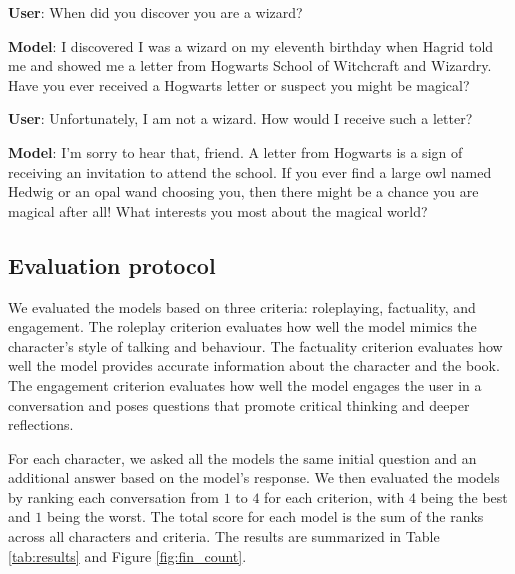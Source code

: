 \documentclass[fleqn,moreauthors,10pt]{ds_report}
\begin{document}
\begin{tcolorbox}[
    title=Mistral,
    colback=white!95!black,
    colbacktitle=white!85!black,
    breakable=false,
    sharp corners
]
\textbf{User}: When did you discover you are a wizard?

\textbf{Model}: I discovered I was a wizard on my eleventh birthday when
Hagrid told me and showed me a letter from Hogwarts School of Witchcraft
and Wizardry. Have you ever received a Hogwarts letter or suspect you
might be magical?

\textbf{User}: Unfortunately, I am not a wizard. How would I receive
such a letter?

\textbf{Model}:  I'm sorry to hear that, friend. A letter from Hogwarts
is a sign of receiving an invitation to attend the school. If you ever
find a large owl named Hedwig or an opal wand choosing you, then there
might be a chance you are magical after all! What interests you most
about the magical world?
\end{tcolorbox}

\subsection*{Evaluation protocol}
We evaluated the models based on three criteria: roleplaying, factuality,
and engagement. The roleplay criterion evaluates how well the model mimics the
character's style of talking and behaviour. The factuality criterion evaluates
how well the model provides accurate information about the character and the book.
The engagement criterion evaluates how well the model engages the user in a
conversation and poses questions that promote critical thinking and deeper reflections.

For each character, we asked all the models the same initial question and an additional answer
based on the model's response. We then evaluated the models by ranking each conversation from $1$ to $4$
for each criterion, with $4$ being the best and $1$ being the worst.
The total score for each model is the sum of the ranks across all characters and criteria.
The results are summarized in Table \ref{tab:results} and Figure \ref{fig:fin_count}.
\end{document}

